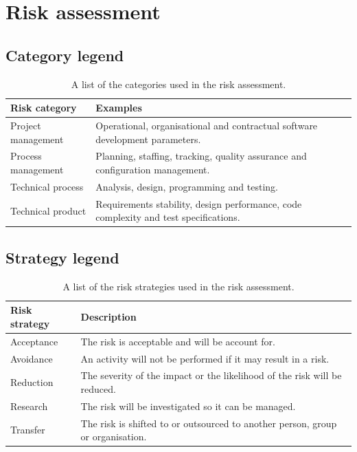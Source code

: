 \documentclass[a4paper]{article}
\begin{document}
\begin{appendices}
{		}
		
		\newpage
		
		\section{Risk assessment} {
		\label{app:risk_assessment}
		
			\subsection{Category legend} {
			\label{sec:category_legend}
			
				\begin{table}[H]
				\begin{tabularx}{\textwidth}{@{}lX@{}}
					\toprule
					\textbf{Risk category} & \textbf{Examples} \\
					\midrule
					Project management & Operational, organisational and contractual software development parameters. \\
					Process management & Planning, staffing, tracking, quality assurance and configuration management. \\
					Technical process & Analysis, design, programming and testing. \\
					Technical product & Requirements stability, design performance, code complexity and test specifications. \\
					\bottomrule
				\end{tabularx}
				\caption{A list of the categories used in the risk assessment.}
				\end{table}
			
			}
			
			\subsection{Strategy legend} {
			\label{sec:strategy_legend}

				\begin{table}[H]
				\begin{tabularx}{\textwidth}{@{}lX@{}}
					\toprule
					\textbf{Risk strategy} & \textbf{Description} \\
					\midrule
					Acceptance & The risk is acceptable and will be account for. \\
					Avoidance & An activity will not be performed if it may result in a risk. \\
					Reduction & The severity of the impact or the likelihood of the risk will be reduced. \\
					Research & The risk will be investigated so it can be managed. \\
					Transfer & The risk is shifted to or outsourced to another person, group or organisation. \\
					\bottomrule
				\end{tabularx}
				\caption{A list of the risk strategies used in the risk assessment.}
				\end{table}

}}
\end{appendices}
\end{document}
